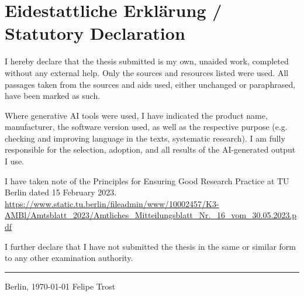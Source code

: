 \chapter*{\LARGE Eidestattliche Erklärung / Statutory Declaration}

\vspace{2em}

\noindent I hereby declare that the thesis submitted is my own, unaided work, completed without any external help. Only
the sources and resources listed were used. All passages taken from the sources and aids used, either
unchanged or paraphrased, have been marked as such.

\noindent Where generative AI tools were used, I have indicated the product name, manufacturer, the software version
used, as well as the respective purpose (e.g. checking and improving language in the texts, systematic
research). I am fully responsible for the selection, adoption, and all results of the AI-generated output I use.

\noindent I have taken note of the Principles for Ensuring Good Research Practice at TU Berlin dated 15 February 2023. \url{https://www.static.tu.berlin/fileadmin/www/10002457/K3-AMBl/Amtsblatt_2023/Amtliches_Mitteilungsblatt_Nr._16_vom_30.05.2023.pdf}

\noindent I further declare that I have not submitted the thesis in the same or similar form to any other examination
authority.
\vspace{30 mm}
\begin{flushright}

\rule{90mm}{1pt}

Berlin, \today \hspace{15 mm} Felipe Trost
\end{flushright}
